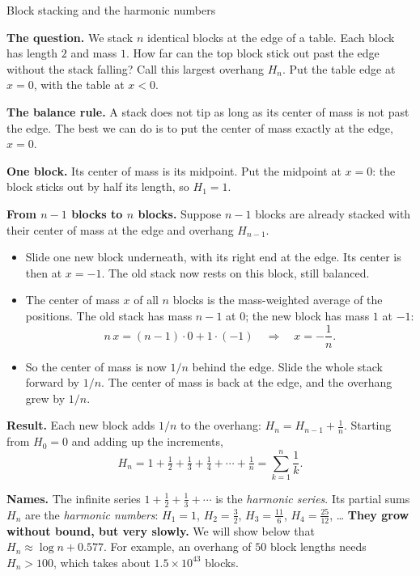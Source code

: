 \documentclass[11pt]{beamer}
\begin{document}
\begin{frame}[allowframebreaks=1.00]{Block stacking and the harmonic numbers}
\footnotesize

\textbf{The question.} We stack \(n\) identical blocks at the edge of a table. Each block has
length \(2\) and mass \(1\). How far can the top block stick out past the edge without the
stack falling? Call this largest overhang \(H_n\). Put the table edge at \(x=0\), with the
table at \(x<0\).

\textbf{The balance rule.} A stack does not tip as long as its center of mass is not past the
edge. The best we can do is to put the center of mass exactly at the edge, \(x=0\).

\textbf{One block.} Its center of mass is its midpoint. Put the midpoint at \(x=0\): the block
sticks out by half its length, so \(H_1=1\).

\textbf{From \(n-1\) blocks to \(n\) blocks.} Suppose \(n-1\) blocks are already stacked with
their center of mass at the edge and overhang \(H_{n-1}\).
\begin{itemize}
  \item Slide one new block underneath, with its right end at the edge. Its center is then at
        \(x=-1\). The old stack now rests on this block, still balanced.
  \item The center of mass \(x\) of all \(n\) blocks is the mass-weighted average of the
        positions. The old stack has mass \(n-1\) at \(0\); the new block has mass \(1\) at \(-1\):
        \[
          n\,x = (n-1)\cdot 0 + 1\cdot(-1)
          \quad\Longrightarrow\quad
          x = -\frac1n .
        \]
  \item So the center of mass is now \(1/n\) behind the edge. Slide the whole stack forward by
        \(1/n\). The center of mass is back at the edge, and the overhang grew by \(1/n\).
\end{itemize}


\textbf{Result.} Each new block adds \(1/n\) to the overhang: \(H_n=H_{n-1}+\frac1n\). Starting from \(H_0=0\) and adding up the increments,
\begin{equation}
  H_n = 1 + \tfrac12 + \tfrac13 + \tfrac14 + \cdots + \tfrac1n
      = \sum_{k=1}^{n}\frac1k .
  \label{eq:harmonic}
\end{equation}


\textbf{Names.} The infinite series \(1+\tfrac12+\tfrac13+\cdots\) is the \emph{harmonic series}.
Its partial sums \(H_n\) are the \emph{harmonic numbers}:
\(H_1=1\), \(H_2=\tfrac32\), \(H_3=\tfrac{11}{6}\), \(H_4=\tfrac{25}{12}\), \dots
\textbf{They grow without bound, but very slowly.} We will show below that
\(H_n\approx\log n+0.577\). For example, an overhang of \(50\) block lengths needs \(H_n>100\), which
takes about \(1.5\times10^{43}\) blocks.


\end{frame}
\end{document}
